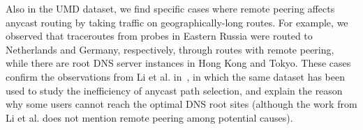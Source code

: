Also in the UMD dataset, we find specific cases where remote peering affects
anycast routing by taking traffic on geographically-long routes. For example, we
observed that traceroutes from probes in Eastern Russia were routed to
Netherlands and Germany, respectively, through routes with remote peering, while
there are root DNS server instances in Hong Kong and Tokyo. These cases confirm
the observations from Li et al. in~\cite{li2018internet}, in which the same
dataset has been used to study the inefficiency of anycast path selection, and
explain the reason why some users cannot reach the optimal DNS root sites
(although the work from Li et al. does not mention remote peering among potential causes).

